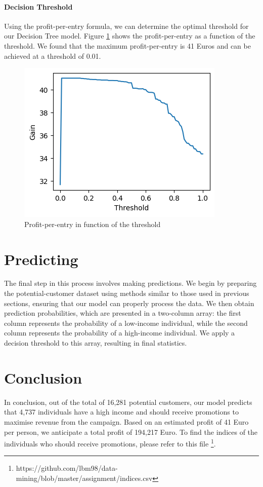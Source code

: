 \documentclass[twocolumn]{article}
\begin{document}
    \paragraph{Decision Threshold}
    Using the profit-per-entry formula, we can determine the optimal threshold for our Decision Tree model. Figure \ref{threshold-gain} shows the profit-per-entry as a function of the threshold. We found that the maximum profit-per-entry is 41 Euros and can be achieved at a threshold of 0.01.

    \begin{figure}[htbp]
        \centerline{\includegraphics[width=0.7\columnwidth]{images/threshold-gain.png}}
        \caption{Profit-per-entry in function of the threshold}
        \label{threshold-gain}
    \end{figure}

\section{Predicting}
    The final step in this process involves making predictions. We begin by preparing the potential-customer dataset using methods similar to those used in previous sections, ensuring that our model can properly process the data. We then obtain prediction probabilities, which are presented in a two-column array: the first column represents the probability of a low-income individual, while the second column represents the probability of a high-income individual. We apply a decision threshold to this array, resulting in final statistics.

\section{Conclusion}
    In conclusion, out of the total of 16,281 potential customers, our model predicts that 4,737 individuals have a high income and should receive promotions to maximise revenue from the campaign. Based on an estimated profit of 41 Euro per person, we anticipate a total profit of 194,217 Euro. To find the indices of the individuals who should receive promotions, please refer to this file
    \footnote{https://github.com/lbm98/data-mining/blob/master/assignment/indices.csv}.
    
\end{document}
